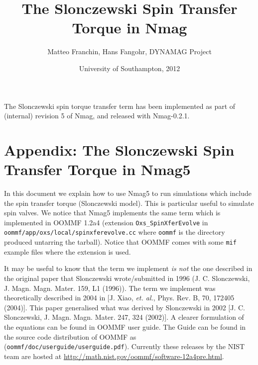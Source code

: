\documentclass[11pt,oneside,openany]{article}
\begin{document}
\title{The Slonczewski Spin Transfer Torque in Nmag}
\author{Matteo Franchin, Hans Fangohr, DYNAMAG Project}
\date{University of Southampton, 2012}

\maketitle

The Slonczewski spin torque transfer term has been implemented as part of (internal) revision 5 of Nmag, and released with Nmag-0.2.1.

\section{Appendix: The Slonczewski Spin Transfer Torque in Nmag5}
In this document we explain how to use Nmag5 to run simulations which
include the spin transfer torque (Slonczewski model). This is particular
useful to simulate spin valves. We notice that Nmag5 implements the same
term which is implemented in OOMMF 1.2a4 (extension \verb|Oxs_SpinXferEvolve|
in \verb|oommf/app/oxs/local/spinxferevolve.cc| where \verb|oommf| is the
directory produced untarring the tarball). Notice that OOMMF comes with some
\verb|mif| example files where the extension is used.

It may be useful to know that the term we implement \emph{is not} the one
described in the original paper that Slonczewski wrote/submitted in 1996
(J. C. Slonczewski, J. Magn. Magn. Mater. 159, L1 (1996)).
The term we implement was theoretically described in 2004
in [J. Xiao, \emph{et. al.}, Phys. Rev. B, 70, 172405 (2004)].
This paper generalised what was derived by Slonczewski in 2002
[J. C. Slonczewski, J. Magn. Magn. Mater. 247, 324 (2002)].
A clearer formulation of the equations can be found in OOMMF user guide. The Guide can be found in the source code distribution of OOMMF as (\verb|oommf/doc/userguide/userguide.pdf|). Currently these releases by the NIST team are hosted at \href{http://math.nist.gov/oommf/software-12a4pre.html}{http://math.nist.gov/oommf/software-12a4pre.html}.
\end{document}
